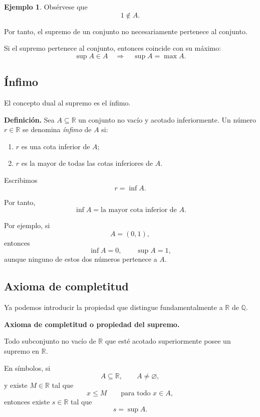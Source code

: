 \documentclass[12pt]{article}
\theoremstyle{plain}
\theoremstyle{definition}
\newtheorem{Ejem}[Teo]{Ejemplo}
\theoremstyle{remark}
\begin{document}
{\begin{Ejem}
Obsérvese que
\[
1\notin A.
\]

Por tanto, el supremo de un conjunto no necesariamente pertenece al
conjunto.
\end{Ejem}

Si el supremo pertenece al conjunto, entonces coincide con su máximo:
\[
\sup A\in A
\quad\Longrightarrow\quad
\sup A=\max A.
\]

\subsection*{Ínfimo}

El concepto dual al supremo es el ínfimo.

\textbf{Definición.}
Sea $A\subseteq\mathbb{R}$ un conjunto no vacío y acotado inferiormente. Un número $r\in\mathbb{R}$ se denomina \emph{ínfimo} de $A$ si:

\begin{enumerate}
    \item $r$ es una cota inferior de $A$;

    \item $r$ es la mayor de todas las cotas inferiores de $A$.
\end{enumerate}

Escribimos
\[
r=\inf A.
\]

Por tanto,
\[
\boxed{
\inf A=\text{la mayor cota inferior de }A.
}
\]

Por ejemplo, si
\[
A=(0,1),
\]
entonces
\[
\inf A=0,
\qquad
\sup A=1,
\]
aunque ninguno de estos dos números pertenece a $A$.

\subsection*{Axioma de completitud}

Ya podemos introducir la propiedad que distingue fundamentalmente a $\mathbb{R}$ de $\mathbb{Q}$.

\textbf{Axioma de completitud o propiedad del supremo.}

Todo subconjunto no vacío de $\mathbb{R}$ que esté acotado superiormente posee un supremo en $\mathbb{R}$.

En símbolos, si
\[
A\subseteq\mathbb{R},
\qquad
A\neq\varnothing,
\]
y existe $M\in\mathbb{R}$ tal que
\[
x\leq M
\qquad\text{para todo }x\in A,
\]
entonces existe $s\in\mathbb{R}$ tal que
\[
s=\sup A.
\]

}
\end{document}
